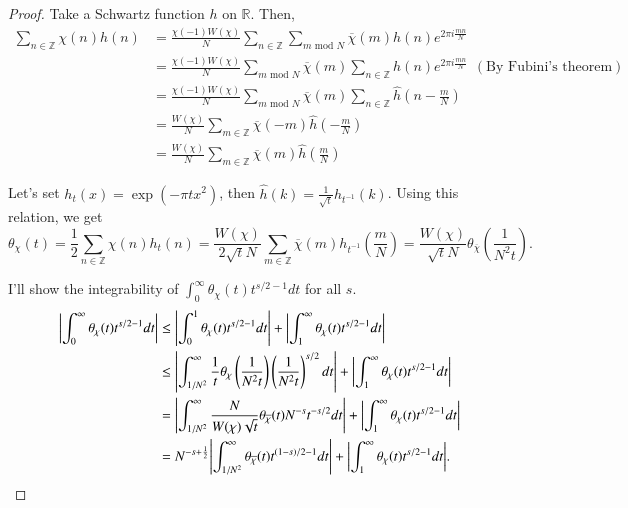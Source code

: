 \documentclass[a4paper, 12pt]{article}
\theoremstyle{Mydefinition}
\theoremstyle{Mytheorem}
\begin{document}
\begin{proof}
Take a Schwartz function $h$ on $\mathbb{R}$.
Then,
\begin{equation*}
\begin{split}
    \sum_{n\in\mathbb{Z}}\chi(n)h(n) &= \frac{\chi(-1)W(\chi)}{N}\sum_{n\in \mathbb{Z}}\sum_{m\textrm{ mod }N}\overline{\chi}(m)h(n)e^{2\pi i \frac{mn}{N}}\\
    &=\frac{\chi(-1)W(\chi)}{N}\sum_{m\textrm{ mod }N}\overline{\chi}(m)\sum_{n\in \mathbb{Z}}h(n)e^{2\pi i \frac{mn}{N}}~~(\textrm{By Fubini's theorem})\\
    &=\frac{\chi(-1)W(\chi)}{N}\sum_{m\textrm{ mod }N}\overline{\chi}(m)\sum_{n\in \mathbb{Z}}\hat{h}\left(n-\frac{m}{N}\right)\\
    &=\frac{W(\chi)}{N}\sum_{m\in \mathbb{Z}}\overline{\chi}(-m)\hat{h}\left(-\frac{m}{N}\right)\\
    &=\frac{W(\chi)}{N}\sum_{m\in \mathbb{Z}}\overline{\chi}(m)\hat{h}\left(\frac{m}{N}\right)
\end{split}
\end{equation*}

Let's set $h_t(x) = \exp(-\pi t x^2)$, then $\hat{h}(k) = \frac{1}{\sqrt{t}}h_{t^{-1}}(k)$. Using this relation, we get
\begin{equation*}
    \theta_\chi(t) = \frac{1}{2}\sum_{n\in\mathbb{Z}}\chi(n)h_t(n) = \frac{W(\chi)}{2\sqrt{t}N}\sum_{m\in \mathbb{Z}}\overline{\chi}(m)h_{t^{-1}}\left(\frac{m}{N}\right) = \frac{W(\chi)}{\sqrt{t}N}\theta_{\overline{\chi}}\left(\frac{1}{N^2 t}\right).
\end{equation*}

I'll show the integrability of $\int_0^\infty \theta_\chi(t)t^{s/2-1}dt$ for all $s$.
\begin{equation*}
\begin{split}
    \abs{\int_0^\infty \theta_\chi(t)t^{s/2-1}dt} &\leq \abs{\int_0^1 \theta_\chi(t)t^{s/2-1}dt} + \abs{\int_1^\infty \theta_\chi(t)t^{s/2-1}dt}\\
    &\leq \abs{\int_{1/N^2}^\infty \frac{1}{t}\theta_{\chi}\left(\frac{1}{N^2t}\right)\left(\frac{1}{N^2 t}\right)^{s/2}dt}+ \abs{\int_1^\infty \theta_\chi(t)t^{s/2-1}dt}\\
    &=\abs{\int_{1/N^2}^\infty \frac{N}{W(\chi)\sqrt{t}}\theta_{\overline{\chi}}(t)N^{-s}t^{-s/2}dt}+ \abs{\int_1^\infty \theta_\chi(t)t^{s/2-1}dt}\\
    &=N^{-s+\frac{1}{2}}\abs{\int_{1/N^2}^\infty \theta_{\overline{\chi}}(t)t^{(1-s)/2-1}dt}+ \abs{\int_1^\infty \theta_\chi(t)t^{s/2-1}dt}.
\end{split}
\end{equation*}


\end{proof}
\end{document}
